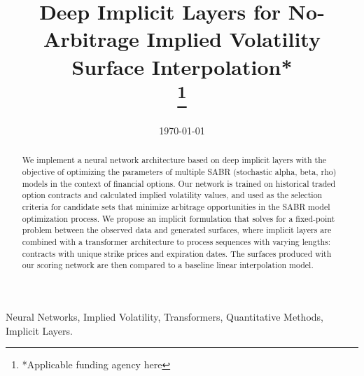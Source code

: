 \title{Deep Implicit Layers for No-Arbitrage Implied Volatility Surface Interpolation*\\
\thanks{*Applicable funding agency here}
}

\author{
}

\date{\today}

\maketitle

\begin{abstract}
    We implement a neural network architecture based on deep implicit layers with the objective of optimizing the parameters of
    multiple SABR (stochastic alpha, beta, rho) models in the context of financial options.
    Our network is trained on historical traded option contracts and calculated implied volatility values,
    and used as the selection criteria for candidate sets that minimize arbitrage opportunities in the SABR model optimization process.
    We propose an implicit formulation that solves for a fixed-point problem between the observed data and generated surfaces,
    where implicit layers are combined with a transformer architecture to process sequences with varying lengths:
    contracts with unique strike prices and expiration dates.
    The surfaces produced with our scoring network are then compared to a baseline linear interpolation model.
\end{abstract}

\begin{IEEEkeywords}
    Neural Networks, Implied Volatility, Transformers, Quantitative Methods, Implicit Layers.
\end{IEEEkeywords}
